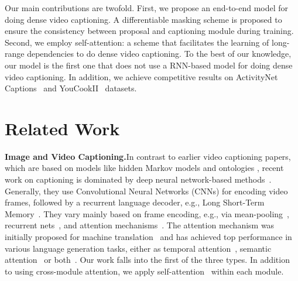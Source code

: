 \documentclass[10pt,twocolumn,letterpaper]{article}
\begin{document}
Our main contributions are twofold. First, we propose an end-to-end model for doing dense video captioning. A differentiable masking scheme is proposed to ensure the consistency between proposal and captioning module during training. Second, we employ self-attention: a scheme that facilitates the learning of long-range dependencies to do dense video captioning. To the best of our knowledge, our model is the first one that does not use a RNN-based model for doing dense video captioning. In addition, we achieve competitive results on ActivityNet Captions~\cite{krishna2017dense} and YouCookII~\cite{zhou2017procnets} datasets.

\section{Related Work}
\label{sec:related}

\noindent\textbf{Image and Video Captioning.}\quad In contrast to earlier video captioning papers, which are based on models like hidden Markov models and ontologies \cite{yu2013grounded, das2013thousand}, recent work on captioning is dominated by deep neural network-based methods~\cite{vinyals2015show,xu2015show,you2016image,zhou2016watch,yao2016boosting,rennie2016self}. 
Generally, they use Convolutional Neural Networks (CNNs) \cite{simonyan2014very,he2016deep} for encoding video frames, followed by a recurrent language decoder, e.g., Long Short-Term Memory~\cite{hochreiter1997long}.
They vary mainly based on frame encoding, e.g., via mean-pooling~\cite{venugopalan2014translating,gan2016semantic}, recurrent nets~\cite{donahue2015long,venugopalan2015sequence}, and attention mechanisms~\cite{yao2015describing,pan2016video,gan2016semantic}.
The attention mechanism was initially proposed for machine translation~\cite{bahdanau2014neural} and has achieved top performance in various language generation tasks, either as temporal attention~\cite{yao2015describing}, semantic attention~\cite{gan2016semantic} or both~\cite{pan2016video}. 
Our work falls into the first of the three types. In addition to using cross-module attention, we apply self-attention~\cite{vaswani2017attention} within each module. 
\end{document}

